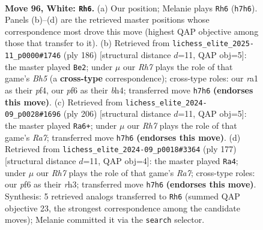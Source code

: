 \documentclass[11pt]{article}
\begin{document}
\clearpage

\begin{figure}[p]\centering
\begin{subfigure}{0.46\textwidth}\centering
\resizebox{\linewidth}{!}{%
\newchessgame
\chessboard[
  setfen={1R6/7R/3kpp2/8/4P3/5PK1/8/r7 w - - 4 96},
  showmover=false,
  pgfstyle=straightmove, color=movearrow, markmove={h7-h6}
]}
\caption{}
\end{subfigure}\hfill
\begin{subfigure}{0.46\textwidth}\centering
\resizebox{\linewidth}{!}{%
\newchessgame
\chessboard[
  setfen={8/kp6/3P4/2P4B/2K2p1b/8/8/8 w - - 3 94},
  showmover=false,
  pgfstyle=straightmove, color=movearrow, markmove={h5-e2}
]}
\caption{}
\end{subfigure}
\\[4pt]
\begin{subfigure}{0.46\textwidth}\centering
\resizebox{\linewidth}{!}{%
\newchessgame
\chessboard[
  setfen={8/R7/5k2/7p/7P/6P1/5K2/1r6 w - - 84 104},
  showmover=false,
  pgfstyle=straightmove, color=movearrow, markmove={a7-a6}
]}
\caption{}
\end{subfigure}\hfill
\begin{subfigure}{0.46\textwidth}\centering
\resizebox{\linewidth}{!}{%
\newchessgame
\chessboard[
  setfen={8/7k/6p1/7p/7P/7R/r7/5K2 b - - 39 89},
  showmover=false,
  pgfstyle=straightmove, color=movearrow, markmove={a2-a4}
]}
\caption{}
\end{subfigure}
\caption{\textbf{Move 96, White: \texttt{Rh6}.} (a) Our position; Melanie plays \texttt{Rh6} (\texttt{h7h6}). Panels (b)--(d) are the retrieved master positions whose correspondence most drove this move (highest QAP objective among those that transfer to it). (b) Retrieved from \texttt{lichess\_elite\_2025-11\_p0000\#1746} (ply 186) [structural distance $d$=11, QAP obj=5]: the master played \texttt{Be2}; under $\mu$ our \emph{Rh7} plays the role of that game's \emph{Bh5} (a \textbf{cross-type} correspondence); cross-type roles: our \emph{r}a1 as their \emph{p}f4, our \emph{p}f6 as their \emph{b}h4; transferred move \texttt{h7h6} \textbf{(endorses this move)}. (c) Retrieved from \texttt{lichess\_elite\_2024-09\_p0028\#1696} (ply 206) [structural distance $d$=11, QAP obj=5]: the master played \texttt{Ra6+}; under $\mu$ our \emph{Rh7} plays the role of that game's \emph{Ra7}; transferred move \texttt{h7h6} \textbf{(endorses this move)}. (d) Retrieved from \texttt{lichess\_elite\_2024-09\_p0018\#3364} (ply 177) [structural distance $d$=11, QAP obj=4]: the master played \texttt{Ra4}; under $\mu$ our \emph{Rh7} plays the role of that game's \emph{Ra7}; cross-type roles: our \emph{p}f6 as their \emph{r}h3; transferred move \texttt{h7h6} \textbf{(endorses this move)}. Synthesis: 5 retrieved analogs transferred to \texttt{Rh6} (summed QAP objective 23, the strongest correspondence among the candidate moves); Melanie committed it via the \texttt{search} selector.}
\label{fig:thought-m190}
\end{figure}
\end{document}
